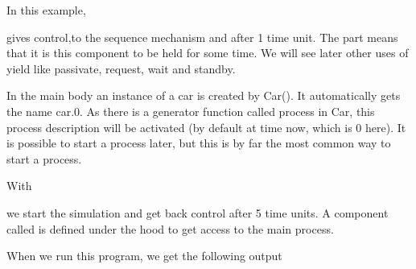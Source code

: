 \documentclass[letterpaper,10pt,english]{sphinxmanual}
\begin{document}
In this example,

\begin{sphinxVerbatim}[commandchars=\\\{\}]
 
\end{sphinxVerbatim}

gives control,to the sequence mechanism and  after 1 time unit. The  part means that
it is this component to be held for some time. We will see later other uses of yield like passivate,
request, wait and standby.

In the main body an instance of a car is created by Car(). It automatically gets the name car.0.
As there is a generator function called
process in Car, this process description will be activated (by default at time now, which is 0 here).
It is possible to start a process later, but this is by far the most common way to start a process.

With

\begin{sphinxVerbatim}[commandchars=\\\{\}]
\end{sphinxVerbatim}

we start the simulation and get back control after 5 time units. A component called  is defined
under the hood to get access to the main process.

When we run this program, we get the following output
\end{document}
